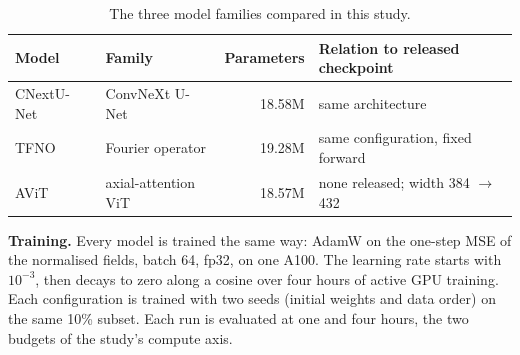 \documentclass[11pt]{article}
\begin{document}
\begin{table}[!htbp]
\centering\footnotesize
\begin{tabular*}{\linewidth}{@{\extracolsep{\fill}}llrl@{}}
\toprule
Model & Family & Parameters & Relation to released checkpoint \\
\midrule
CNextU-Net~\cite{liu2022convnext} & ConvNeXt U-Net & 18.58M & same architecture \\
TFNO~\cite{li2021fno,kossaifi2024tfno} & Fourier operator & 19.28M & same configuration, fixed forward \\
AViT~\cite{mccabe2024mpp} & axial-attention ViT & 18.57M & none released; width 384 $\to$ 432 \\
\bottomrule
\end{tabular*}
\caption{The three model families compared in this study.}
\label{tab:models}
\end{table}

\textbf{Training.} Every model is trained the same way: AdamW on the one-step MSE of the normalised fields, batch
64, fp32, on one A100. The learning rate starts with $10^{-3}$, then decays to zero along a
cosine over four hours of active GPU training. Each configuration is trained with two seeds (initial weights and data order) on the same 10\%
subset. Each run is evaluated at one and four hours, the two budgets of the study's compute axis. 



\end{document}
